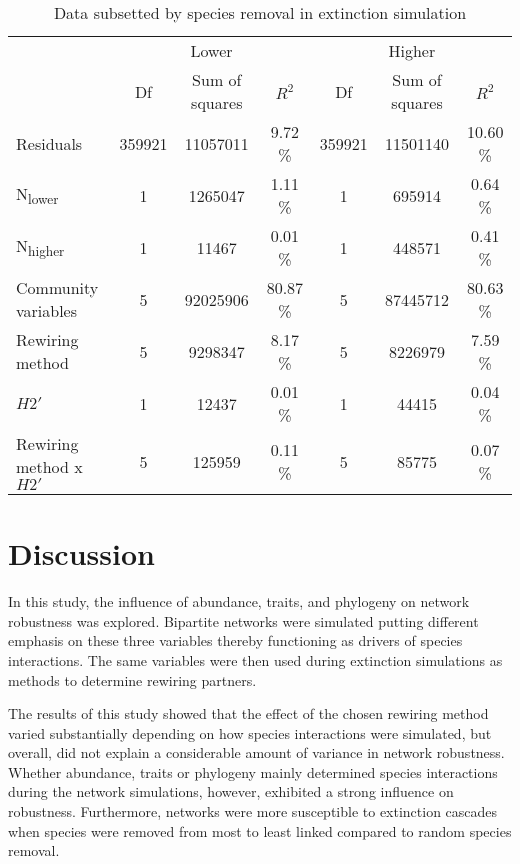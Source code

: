 \documentclass[12pt,a4paper]{article}
\begin{document}
\begin{table}[H]
\begin{subtable}{\linewidth}
\caption{Data subsetted by species removal in extinction simulation}
\label{tab:anova_lo_hi_deg}
\begin{tabularx}{\linewidth}{@{} X *6{c} @{}}
\toprule
  & \multicolumn{3}{c}{Lower} & \multicolumn{3}{c}{Higher} \\ \cmidrule(l){2-4} \cmidrule(l){5-7} 
  						& Df 	& Sum of squares	& $R^2$ 		& Df 	& Sum of squares 	& $R^2$  \\ \midrule
Residuals 				& 359921 & 11057011  		& 9.72 \% 	& 359921	& 11501140 			& 10.60 \%\\ 
N\textsubscript{lower} 	& 1 		& 1265047 		& 1.11 \% 	& 1 		& 695914 			& 0.64 \%\\
N\textsubscript{higher} 	& 1 		& 11467 			& 0.01 \% 	& 1 		& 448571 			& 0.41 \%\\
Community variables 		& 5 		& 92025906 		& 80.87 \% 	& 5 		& 87445712 			& 80.63 \%\\
Rewiring method 			& 5 		& 9298347		& 8.17 \% 	& 5 		& 8226979				& 7.59 \%\\ 
$H2'$ 					& 1 		& 12437 			& 0.01 \% 	& 1 		& 44415 				& 0.04 \%\\
Rewiring method x $H2'$ 	& 5 		& 125959 			& 0.11 \% 	& 5 		& 85775				& 0.07 \%\\ \bottomrule
\end{tabularx}
\end{subtable}
\medskip
\end{table}

	\section{Discussion}

In this study, the influence of abundance, traits, and phylogeny on network robustness was explored. Bipartite networks were simulated putting different emphasis on these three variables thereby functioning as drivers of species interactions. The same variables were then used during extinction simulations as methods to determine rewiring partners.\par
The results of this study showed that the effect of the chosen rewiring method varied substantially depending on how species interactions were simulated, but overall, did not explain a considerable amount of variance in network robustness. Whether abundance, traits or phylogeny mainly determined species interactions during the network simulations, however, exhibited a strong influence on robustness. Furthermore, networks were more susceptible to extinction cascades when species were removed from most to least linked compared to random species removal.\paragraph{}
\end{document}
